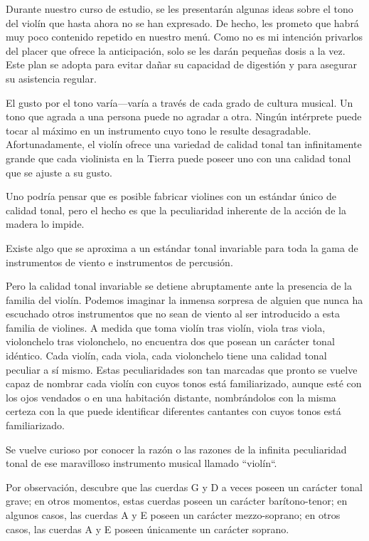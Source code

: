 \documentclass[12pt]{book}
\begin{document}
Durante nuestro curso de estudio, se les presentarán algunas ideas sobre el tono del violín que hasta ahora no se han expresado. De hecho, les prometo que habrá muy poco contenido repetido en nuestro menú. Como no es mi intención privarlos del placer que ofrece la anticipación, solo se les darán pequeñas dosis a la vez. Este plan se adopta para evitar dañar su capacidad de digestión y para asegurar su asistencia regular.

El gusto por el tono varía—varía a través de cada grado de cultura musical. Un tono que agrada a una persona puede no agradar a otra. Ningún intérprete puede tocar al máximo en un instrumento cuyo tono le resulte desagradable. Afortunadamente, el violín ofrece una variedad de calidad tonal tan infinitamente grande que cada violinista en la Tierra puede poseer uno con una calidad tonal que se ajuste a su gusto.

Uno podría pensar que es posible fabricar violines con un estándar único de calidad tonal, pero el hecho es que la peculiaridad inherente de la acción de la madera lo impide.

Existe algo que se aproxima a un estándar tonal invariable para toda la gama de instrumentos de viento e instrumentos de percusión.

Pero la calidad tonal invariable se detiene abruptamente ante la presencia de la familia del violín. Podemos imaginar la inmensa sorpresa de alguien que nunca ha escuchado otros instrumentos que no sean de viento al ser introducido a esta familia de violines. A medida que toma violín tras violín, viola tras viola, violonchelo tras violonchelo, no encuentra dos que posean un carácter tonal idéntico. Cada violín, cada viola, cada violonchelo tiene una calidad tonal peculiar a sí mismo. Estas peculiaridades son tan marcadas que pronto se vuelve capaz de nombrar cada violín con cuyos tonos está familiarizado, aunque esté con los ojos vendados o en una habitación distante, nombrándolos con la misma certeza con la que puede identificar diferentes cantantes con cuyos tonos está familiarizado.

Se vuelve curioso por conocer la razón o las razones de la infinita peculiaridad tonal de ese maravilloso instrumento musical llamado ``violín``.

Por observación, descubre que las cuerdas G y D a veces poseen un carácter tonal grave; en otros momentos, estas cuerdas poseen un carácter barítono-tenor; en algunos casos, las cuerdas A y E poseen un carácter mezzo-soprano; en otros casos, las cuerdas A y E poseen únicamente un carácter soprano.
\end{document}
